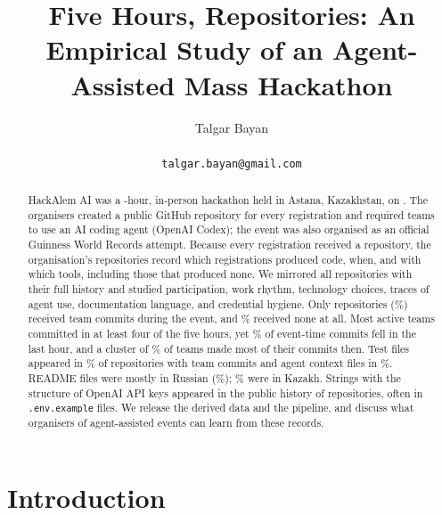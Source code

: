 \documentclass{article}
\title{Five Hours, \NReposTotal{} Repositories: An Empirical Study of an Agent-Assisted Mass Hackathon}
\author{
  Talgar Bayan \\
  \pending{affiliation} \\
  \texttt{talgar.bayan@gmail.com}
}
\begin{document}
\maketitle

\begin{abstract}
HackAlem AI was a \eventhours-hour, in-person hackathon held in Astana, Kazakhstan, on \eventdate. The organisers created a public GitHub repository for every registration and required teams to use an AI coding agent (OpenAI Codex); the event was also organised as an official Guinness World Records attempt. Because every registration received a repository, the organisation's \NReposTotal{} repositories record which registrations produced code, when, and with which tools, including those that produced none. We mirrored all repositories with their full history and studied participation, work rhythm, technology choices, traces of agent use, documentation language, and credential hygiene. Only \NReposActive{} repositories (\NPctActive\%) received team commits during the event, and \NPctEmpty\% received none at all. Most active teams committed in at least four of the five hours, yet \NPctLastHour\% of event-time commits fell in the last hour, and a cluster of \NRhythmCTwoPct\% of teams made most of their commits then. Test files appeared in \NHasTestsPct\% of repositories with team commits and agent context files in \NAnyAgentFilePct\%. README files were mostly in Russian (\NReadmeRussianPct\%); \NReadmeKazakhPct\% were in Kazakh. Strings with the structure of OpenAI API keys appeared in the public history of \NReposOpenaiKeyN{} repositories, often in \texttt{.env.example} files. We release the derived data and the pipeline, and discuss what organisers of agent-assisted events can learn from these records.
\end{abstract}

\section{Introduction}\label{sec:intro}
\end{document}

